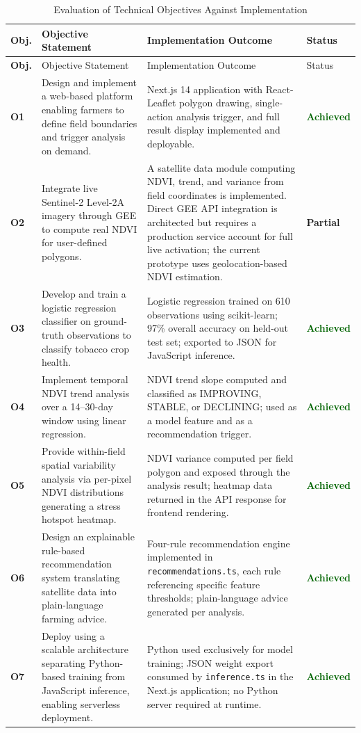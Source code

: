 \begin{longtable}{>{\bfseries}p{0.8cm} p{4.2cm} p{6.5cm} >{\centering\arraybackslash}p{1.5cm}}
\caption{Evaluation of Technical Objectives Against Implementation}\label{tab:objectives}\\
\toprule
Obj. & Objective Statement & Implementation Outcome & Status \\
\midrule
\endfirsthead
\toprule
Obj. & Objective Statement & Implementation Outcome & Status \\
\midrule
\endhead
\bottomrule
\endfoot
O1 & Design and implement a web-based platform enabling farmers to define field boundaries and trigger analysis on demand. & Next.js 14 application with React-Leaflet polygon drawing, single-action analysis trigger, and full result display implemented and deployable. & \textcolor{darkgreen}{\textbf{Achieved}} \\[6pt]
O2 & Integrate live Sentinel-2 Level-2A imagery through GEE to compute real NDVI for user-defined polygons. & A satellite data module computing NDVI, trend, and variance from field coordinates is implemented. Direct GEE API integration is architected but requires a production service account for full live activation; the current prototype uses geolocation-based NDVI estimation. & \textcolor{amber}{\textbf{Partial}} \\[6pt]
O3 & Develop and train a logistic regression classifier on ground-truth observations to classify tobacco crop health. & Logistic regression trained on 610 observations using scikit-learn; 97\% overall accuracy on held-out test set; exported to JSON for JavaScript inference. & \textcolor{darkgreen}{\textbf{Achieved}} \\[6pt]
O4 & Implement temporal NDVI trend analysis over a 14--30-day window using linear regression. & NDVI trend slope computed and classified as IMPROVING, STABLE, or DECLINING; used as a model feature and as a recommendation trigger. & \textcolor{darkgreen}{\textbf{Achieved}} \\[6pt]
O5 & Provide within-field spatial variability analysis via per-pixel NDVI distributions generating a stress hotspot heatmap. & NDVI variance computed per field polygon and exposed through the analysis result; heatmap data returned in the API response for frontend rendering. & \textcolor{darkgreen}{\textbf{Achieved}} \\[6pt]
O6 & Design an explainable rule-based recommendation system translating satellite data into plain-language farming advice. & Four-rule recommendation engine implemented in \texttt{recommendations.ts}, each rule referencing specific feature thresholds; plain-language advice generated per analysis. & \textcolor{darkgreen}{\textbf{Achieved}} \\[6pt]
O7 & Deploy using a scalable architecture separating Python-based training from JavaScript inference, enabling serverless deployment. & Python used exclusively for model training; JSON weight export consumed by \texttt{inference.ts} in the Next.js application; no Python server required at runtime. & \textcolor{darkgreen}{\textbf{Achieved}} \\[6pt]
\end{longtable}

